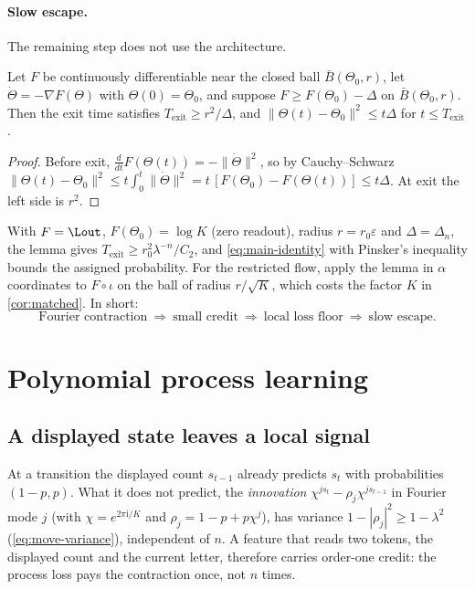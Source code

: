 \paragraph{Slow escape.} The remaining step does not use the architecture.
\begin{lemma}\label{lem:escape}
Let $F$ be continuously differentiable near the closed ball $\bar B(\Theta_0,r)$, let $\dot\Theta=-\nabla F(\Theta)$ with $\Theta(0)=\Theta_0$, and suppose $F\ge F(\Theta_0)-\Delta$ on $\bar B(\Theta_0,r)$. Then the exit time satisfies $T_{\mathrm{exit}}\ge r^2/\Delta$, and $\|\Theta(t)-\Theta_0\|^2\le t\Delta$ for $t\le T_{\mathrm{exit}}$.
\end{lemma}
\begin{proof}
Before exit, $\frac{d}{dt}F(\Theta(t))=-\|\dot\Theta\|^2$, so by Cauchy--Schwarz
$\|\Theta(t)-\Theta_0\|^2\le t\int_0^t\|\dot\Theta\|^2=t\,[F(\Theta_0)-F(\Theta(t))]\le t\Delta$. At exit the left side is $r^2$.
\end{proof}
With $F=\Lout$, $F(\Theta_0)=\log K$ (zero readout), radius $r=r_0\varepsilon$ and $\Delta=\Delta_n$, the lemma gives $T_{\mathrm{exit}}\ge r_0^2\lambda^{-n}/C_2$, and \cref{eq:main-identity} with Pinsker's inequality bounds the assigned probability. For the restricted flow, apply the lemma in $\alpha$ coordinates to $F\circ\iota$ on the ball of radius $r/\sqrt K$, which costs the factor $K$ in \cref{cor:matched}. In short:
\[
\text{Fourier contraction}\ \Longrightarrow\ \text{small credit}\ \Longrightarrow\ \text{local loss floor}\ \Longrightarrow\ \text{slow escape}.
\]

\section{Polynomial process learning}\label{sec:process}
\subsection{A displayed state leaves a local signal}
At a transition the displayed count $s_{t-1}$ already predicts $s_t$ with probabilities $(1-p,p)$. What it does not predict, the \emph{innovation} $\chi^{js_t}-\rho_j\chi^{js_{t-1}}$ in Fourier mode $j$ (with $\chi=e^{2\pi\mathrm i/K}$ and $\rho_j=1-p+p\chi^j$), has variance $1-|\rho_j|^2\ge1-\lambda^2$ (\cref{eq:move-variance}), independent of $n$. A feature that reads two tokens, the displayed count and the current letter, therefore carries order-one credit: the process loss pays the contraction once, not $n$ times.

